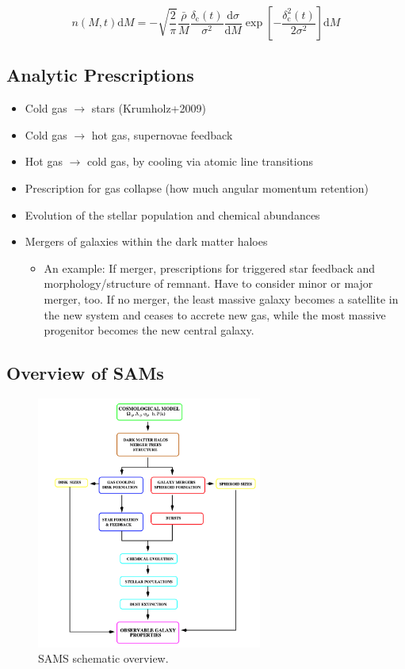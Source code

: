 \documentclass{article}
\begin{document}
\begin{equation}
    n(M, t) \mathrm{d} M=-\sqrt{\frac{2}{\pi}} \frac{\bar{\rho}}{M} \frac{\delta_{\mathrm{c}}(t)}{\sigma^{2}} \frac{\mathrm{d} \sigma}{\mathrm{d} M} \exp \left[-\frac{\delta_{\mathrm{c}}^{2}(t)}{2 \sigma^{2}}\right] \mathrm{d} M
\end{equation}

\subsection{Analytic Prescriptions}

\begin{itemize}
    \item Cold gas $\rightarrow$ stars (Krumholz+2009)
    \item Cold gas $\rightarrow$ hot gas, supernovae feedback
    \item Hot gas $\rightarrow$ cold gas, by cooling via atomic line transitions 
    \item Prescription for gas collapse (how much angular momentum retention)
    \item Evolution of the stellar population and chemical abundances
    \item Mergers of galaxies within the dark matter haloes
    \begin{itemize}
        \item An example: If merger, prescriptions for triggered star feedback and morphology/structure of remnant. Have to consider minor or major merger, too. If no merger, the least massive galaxy becomes a satellite in the new system and ceases to accrete new gas, while the most massive progenitor becomes the new central galaxy. 
    \end{itemize}
\end{itemize}


\subsection{Overview of SAMs}

\begin{figure}
    \centering
    \includegraphics[width=0.66\textwidth]{figs/Screen Shot 2021-11-17 at 10.39.52 AM.png}
    \caption{SAMS schematic overview.}
    \label{fig:overview_schematic}
\end{figure}
\end{document}
